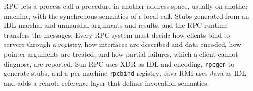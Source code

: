 \documentclass[../main.tex]{subfiles}
\begin{document}
\begin{keypoint}
  RPC lets a process call a procedure in another address space, usually on
  another machine, with the synchronous semantics of a local call.  Stubs
  generated from an IDL marshal and unmarshal arguments and results, and
  the RPC runtime transfers the messages.  Every RPC system must decide how
  clients bind to servers through a registry, how interfaces are described
  and data encoded, how pointer arguments are treated, and how partial
  failures, which a client cannot diagnose, are reported.  Sun RPC uses
  XDR as IDL and encoding, \texttt{rpcgen} to generate stubs, and a
  per-machine \texttt{rpcbind} registry; Java RMI uses Java as IDL and adds
  a remote reference layer that defines invocation semantics.
\end{keypoint}
\end{document}
